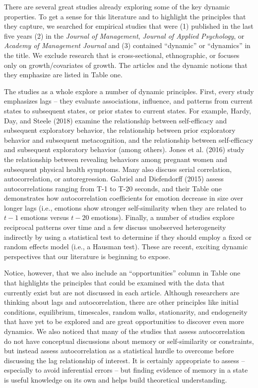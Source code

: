 \documentclass[english,,man]{apa6}
\theoremstyle{definition}
\theoremstyle{definition}
\theoremstyle{definition}
\theoremstyle{remark}
\begin{document}
There are several great studies already exploring some of the key
dynamic properties. To get a sense for this literature and to highlight
the principles that they capture, we searched for empirical studies that
were (1) published in the last five years (2) in the \emph{Journal of
Management}, \emph{Journal of Applied Psychology}, or \emph{Academy of
Management Journal} and (3) contained \enquote{dynamic} or
\enquote{dynamics} in the title. We exclude research that is
cross-sectional, ethnographic, or focuses only on growth/covariates of
growth. The articles and the dynamic notions that they emphasize are
listed in Table one.

The studies as a whole explore a number of dynamic principles. First,
every study emphasizes lags -- they evaluate associations, influence,
and patterns from current states to subsequent states, or prior states
to current states. For example, Hardy, Day, and Steele (2018) examine
the relationship between self-efficacy and subsequent exploratory
behavior, the relationship between prior exploratory behavior and
subsequent metacognition, and the relationship between self-efficacy and
subsequent exploratory behavior (among others). Jones et al. (2016)
study the relationship between revealing behaviors among pregnant women
and subsequent physical health symptoms. Many also discuss serial
correlation, autocorrelation, or autoregression. Gabriel and Diefendorff
(2015) assess autocorrelations ranging from T-1 to T-20 seconds, and
their Table one demonstrates how autocorrelation coefficients for
emotion decrease in size over longer lags (i.e., emotions show stronger
self-similarity when they are related to \(t-1\) emotions versus
\(t-20\) emotions). Finally, a number of studies explore reciprocal
patterns over time and a few discuss unobserved heterogeneity indirectly
by using a statistical test to determine if they should employ a fixed
or random effects model (i.e., a Hausman test). These are recent,
exciting dynamic perspectives that our literature is beginning to
expose.

Notice, however, that we also include an \enquote{opportunities} column
in Table one that highlights the principles that could be examined with
the data that currently exist but are not discussed in each article.
Although researchers are thinking about lags and autocorrelation, there
are other principles like initial conditions, equilibrium, timescales,
random walks, stationarity, and endogeneity that have yet to be explored
and are great opportunities to discover even more dynamics. We also
noticed that many of the studies that assess autocorrelation do not have
conceptual discussions about memory or self-similarity or constraints,
but instead assess autocorrelation as a statistical hurdle to overcome
before discussing the lag relationship of interest. It is certainly
appropriate to assess -- especially to avoid inferential errors -- but
finding evidence of memory in a state is useful knowledge on its own and
helps build theoretical understanding.
\end{document}
